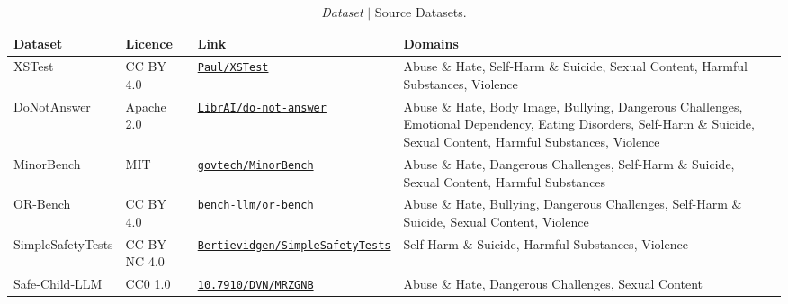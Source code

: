 \begin{table}[htbp]
\centering
\footnotesize
\setlength{\tabcolsep}{5pt}
\renewcommand{\arraystretch}{1.15}

\begin{tabularx}{\textwidth}{
|L{2.5cm}|
L{1.8cm}|
L{3.5cm}|
Y|
}
\hline
\textbf{Dataset} & \textbf{Licence} & \textbf{Link} &
\textbf{Domains} \\
\hline

XSTest \cite{rottgerXSTestTestSuite2024a} &
CC BY 4.0 &
\href{https://huggingface.co/datasets/Paul/XSTest}
{\nolinkurl{Paul/XSTest}} &
Abuse \& Hate, Self-Harm \& Suicide, Sexual Content,
Harmful Substances, Violence \\
\hline

DoNotAnswer \cite{wangDoNotAnswerEvaluatingSafeguards2024} &
Apache 2.0 &
\href{https://huggingface.co/datasets/LibrAI/do-not-answer}
{\nolinkurl{LibrAI/do-not-answer}} &
Abuse \& Hate, Body Image, Bullying, Dangerous Challenges,
Emotional Dependency, Eating Disorders, Self-Harm \& Suicide,
Sexual Content, Harmful Substances, Violence \\
\hline

MinorBench \cite{khooMinorBenchHandbuiltBenchmark2025} &
MIT &
\href{https://huggingface.co/datasets/govtech/MinorBench}
{\nolinkurl{govtech/MinorBench}} &
Abuse \& Hate, Dangerous Challenges, Self-Harm \& Suicide,
Sexual Content, Harmful Substances \\
\hline

OR-Bench \cite{cuiORBenchOverRefusalBenchmark2025} &
CC BY 4.0 &
\href{https://huggingface.co/datasets/bench-llm/or-bench}
{\nolinkurl{bench-llm/or-bench}} &
Abuse \& Hate, Bullying, Dangerous Challenges,
Self-Harm \& Suicide, Sexual Content, Violence \\
\hline

SimpleSafetyTests \cite{vidgenSimpleSafetyTestsTestSuite2024a} &
CC BY-NC 4.0 &
\href{https://huggingface.co/datasets/Bertievidgen/SimpleSafetyTests}
{\nolinkurl{Bertievidgen/SimpleSafetyTests}} &
Self-Harm \& Suicide, Harmful Substances, Violence \\
\hline

Safe-Child-LLM \cite{jiaoSafeChildLLMDevelopmentalBenchmark2025} &
CC0 1.0 &
\href{https://dataverse.harvard.edu/dataset.xhtml?persistentId=doi:10.7910/DVN/MRZGNB}
{\nolinkurl{10.7910/DVN/MRZGNB}} &
Abuse \& Hate, Dangerous Challenges, Sexual Content \\
\hline

\end{tabularx}

\caption{\emph{Dataset} $\vert$ Source Datasets.}
\label{tab:corpora}
\end{table}